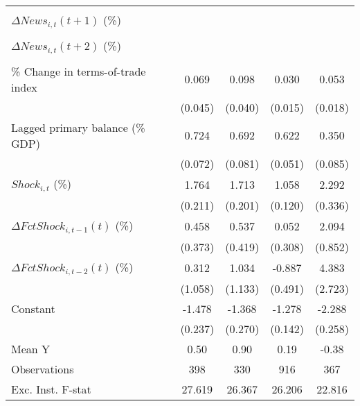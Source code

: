{\begin{tabular}{l*{4}{c}}
                    &                     &                     &                     &                     \\
\addlinespace
$ \Delta News_{i,t}(t+1)$ (\%)&                     &                     &                     &                     \\
                    &                     &                     &                     &                     \\
\addlinespace
$ \Delta News_{i,t}(t+2)$ (\%)&                     &                     &                     &                     \\
                    &                     &                     &                     &                     \\
\addlinespace
\% Change in terms-of-trade index&       0.069         &       0.098\sym{**} &       0.030\sym{**} &       0.053\sym{***}\\
                    &     (0.045)         &     (0.040)         &     (0.015)         &     (0.018)         \\
\addlinespace
Lagged primary balance (\% GDP)&       0.724\sym{***}&       0.692\sym{***}&       0.622\sym{***}&       0.350\sym{***}\\
                    &     (0.072)         &     (0.081)         &     (0.051)         &     (0.085)         \\
\addlinespace
$ Shock_{i,t}$ (\%) &       1.764\sym{***}&       1.713\sym{***}&       1.058\sym{***}&       2.292\sym{***}\\
                    &     (0.211)         &     (0.201)         &     (0.120)         &     (0.336)         \\
\addlinespace
$ \Delta FctShock_{i,t-1}(t)$ (\%)&       0.458         &       0.537         &       0.052         &       2.094\sym{**} \\
                    &     (0.373)         &     (0.419)         &     (0.308)         &     (0.852)         \\
\addlinespace
$ \Delta FctShock_{i,t-2}(t)$ (\%)&       0.312         &       1.034         &      -0.887\sym{*}  &       4.383         \\
                    &     (1.058)         &     (1.133)         &     (0.491)         &     (2.723)         \\
\addlinespace
Constant            &      -1.478\sym{***}&      -1.368\sym{***}&      -1.278\sym{***}&      -2.288\sym{***}\\
                    &     (0.237)         &     (0.270)         &     (0.142)         &     (0.258)         \\
\midrule
Mean Y              &        0.50         &        0.90         &        0.19         &       -0.38         \\
Observations        &         398         &         330         &         916         &         367         \\
Exc. Inst. F-stat   &      27.619         &      26.367         &      26.206         &      22.816         \\
\bottomrule
\end{tabular}
}
